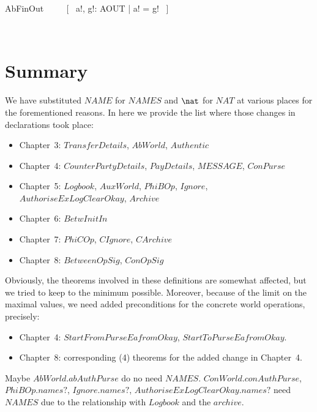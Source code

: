 \begin{LSDef}
\begin{zed}
   AbFinOut ~~~~ [~ a!, g!: AOUT | a! = g! ~]
\end{zed}~\end{LSDef}


\section{Summary}\label{ch3.summary}

We have substituted $NAME$ for $NAMES$ and $\nat$ for $NAT$ at various places
for the forementioned reasons. In here we provide the list where those changes
in declarations took place:
%
\begin{itemize}
   \item Chapter~3: $TransferDetails$, $AbWorld$, $Authentic$
   \item Chapter~4: $CounterPartyDetails$, $PayDetails$, $MESSAGE$, $ConPurse$
   \item Chapter~5: $Logbook$, $AuxWorld$, $PhiBOp$, $Ignore$, $AuthoriseExLogClearOkay$, $Archive$
   \item Chapter~6: $BetwInitIn$
   \item Chapter~7: $PhiCOp$, $CIgnore$, $CArchive$
   \item Chapter~8: $BetweenOpSig$, $ConOpSig$
\end{itemize}
%
Obviously, the theorems involved in these definitions are somewhat affected, but we
tried to keep to the minimum possible. Moreover, because of the limit on the maximal
values, we need added preconditions for the concrete world operations, precisely:
%
\begin{itemize}
   \item Chapter~4: $StartFromPurseEafromOkay$, $StartToPurseEafromOkay$.
   \item Chapter~8: corresponding (4) theorems for the added change in Chapter~4.
\end{itemize}
%
%
Maybe $AbWorld.abAuthPurse$ do no need $NAMES$.
%
$ConWorld.conAuthPurse$, $PhiBOp.names?$, $Ignore.names?$, $AuthoriseExLogClearOkay.names?$
need $NAMES$ due to the relationship with $Logbook$ and the $archive$.

\ldefsummary %
\lthmsummary %
\lthmaddeddefsummary %
\lthmaddedthmsummary %
\lzevessummary %


